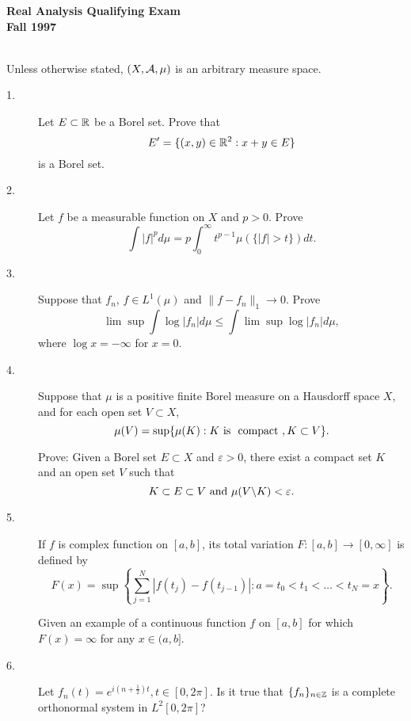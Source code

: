 \documentclass{article}
\begin{document}






\begin{center}\begin{LARGE}
{\bf Real Analysis  Qualifying Exam}\\ 
{\bf Fall 1997}\\ \end{LARGE}
\end{center}
\vspace{0.1in}
\noindent\hrulefill\\
Unless otherwise stated, $(X, {\cal A}, \mu)$ is an arbitrary measure
space.

\begin{description}
\item[1.]
Let $E \subset \Bbb R$ be a Borel set. Prove that
$$E^\prime = \{(x,y) \in \Bbb R^2 : x + y \in E\}$$
is a Borel set.

\item[2.]
Let $f$ be a measurable function on $X$ and $p>0$. Prove
$$\int |f|^p d\mu = p \int^\infty_0 t^{p-1} \mu (\{ |f| > t \})dt.$$

\item[3.]
Suppose that $f_n$, $f \in L^1(\mu)$ and
$\parallel f - f_n \parallel_1 \to 0$. Prove
$$\lim \sup \int \log |f_n| d \mu \leq \int \lim \sup \log |f_n| d \mu,$$
where $\log x = -\infty$ for $x=0$.

\item[4.]
Suppose that $\mu$ is a positive finite Borel measure on a Hausdorff space
$X$, and for each open set $V \subset X$,
$$\mu (V) = \sup \{\mu (K) : K \hbox{\ is\ } \hbox{\ compact\ },
K \subset V \}.$$

Prove: Given a Borel set $E \subset X$ and $\varepsilon >0$, there exist a
compact set $K$ and an open set $V$ such that
$$K \subset E \subset V \hbox{\ and\ } \mu(V \backslash K) < \varepsilon.$$

\item[5.]
If $f$ is complex function on $[a,b]$, its total variation
$F : [a,b] \to [0, \infty]$ is defined by
$$F(x) = \sup \left\{ \sum^N_{j=1} \left| f(t_j) - f(t_{j-1}) \right|:
a = t_0 < t_1 < \dots < t_N= x \right\}.$$

Given an example of a continuous function $f$ on $[a,b]$ for which
$F(x)= \infty$ for any $x \in (a,b]$.

\item[6.]
Let $f_n(t) = e^{i(n+ \frac{1}{2})t}, t \in [0,2\pi]$. Is it true that
$\{f_n\}_{n \in \Bbb Z}$ is a complete orthonormal system in
$L^2[0,2\pi]$?


\end{description}
\end{document}
